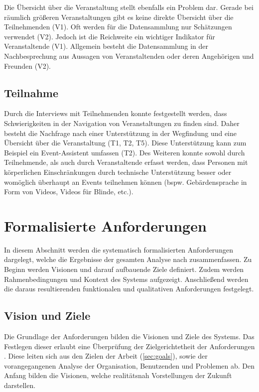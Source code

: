 Die Übersicht über die Veranstaltung stellt ebenfalls ein Problem dar. Gerade
bei räumlich größeren Veranstaltungen gibt es keine direkte Übersicht über die
Teilnehmenden (V1). Oft werden für die Datensammlung nur Schätzungen verwendet
(V2). Jedoch ist die Reichweite ein wichtiger Indikator für Veranstaltende (V1).
Allgemein besteht die Datensammlung in der Nachbesprechung aus Aussagen von
Veranstaltenden oder deren Angehörigen und Freunden (V2).

\subsection{Teilnahme} \label{ssec:analysis-problems-teil}

Durch die Interviews mit Teilnehmenden konnte festgestellt werden, dass
Schwierigkeiten in der Navigation von Veranstaltungen zu finden sind. Daher
besteht die Nachfrage nach einer Unterstützung in der Wegfindung und eine
Übersicht über die Veranstaltung (T1, T2, T5). Diese Unterstützung kann zum
Beispiel ein Event-Assistent umfassen (T2). Des Weiteren konnte sowohl
durch Teilnehmende, als auch durch Veranstaltende erfasst werden, dass Personen
mit körperlichen Einschränkungen durch technische Unterstützung besser oder
womöglich überhaupt an Events teilnehmen können (bspw. Gebärdensprache in Form
von Videos, Videos für Blinde, etc.).


\section{Formalisierte Anforderungen} \label{sec:analysis-anf}

In diesem Abschnitt werden die systematisch formalisierten Anforderungen
dargelegt, welche die Ergebnisse der gesamten Analyse nach
\textcite{Balzert2009} zusammenfassen. Zu Beginn werden Visionen und darauf
aufbauende Ziele definiert. Zudem werden Rahmenbedingungen und Kontext des
Systems aufgezeigt. Anschließend werden die daraus resultierenden funktionalen
und qualitativen Anforderungen festgelegt.

\subsection{Vision und Ziele}

Die Grundlage der Anforderungen bilden die Visionen und Ziele des Systems. Das
Festlegen dieser erlaubt eine Überprüfung der Zielgerichtetheit der
Anforderungen \cite{Balzert2009}. Diese leiten sich aus den Zielen der Arbeit
(\autoref{sec:goals}), sowie der vorangegangenen Analyse der Organisation,
Benutzenden und Problemen ab. Den Anfang bilden die Visionen, welche
realitätsnah Vorstellungen der Zukunft darstellen.

